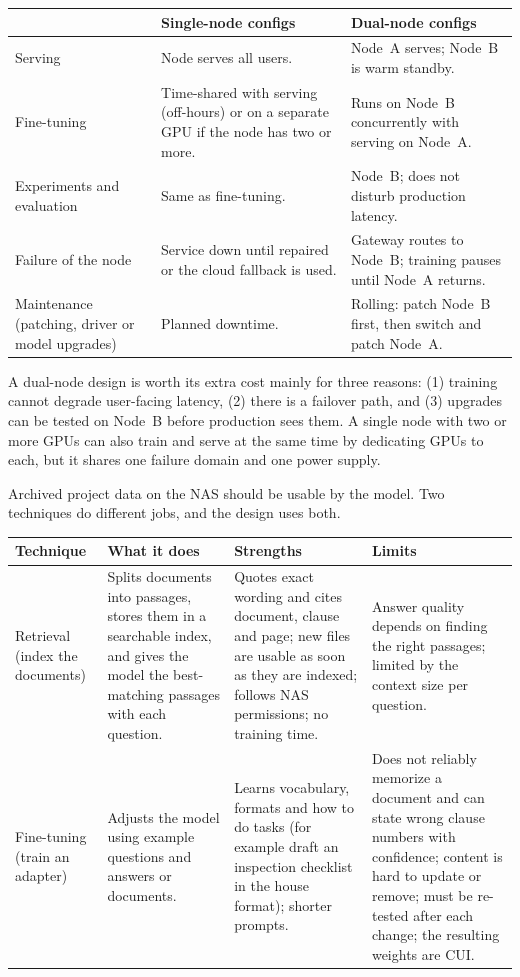 
{\small
\begin{tabularx}{\textwidth}{@{}Y{0.778}Y{1.111}Y{1.111}@{}}
  \toprule
  & Single-node configs & Dual-node configs \\
  \midrule
  Serving & Node serves all users. & Node~A serves; Node~B is warm standby. \\
  Fine-tuning & Time-shared with serving (off-hours) or on a separate GPU if the node has two or more. & Runs on Node~B concurrently with serving on Node~A. \\
  Experiments and evaluation & Same as fine-tuning. & Node~B; does not disturb production latency. \\
  Failure of the node & Service down until repaired or the cloud fallback is used. & Gateway routes to Node~B; training pauses until Node~A returns. \\
  Maintenance (patching, driver or model upgrades) & Planned downtime. & Rolling: patch Node~B first, then switch and patch Node~A. \\
  \bottomrule
\end{tabularx}}

A dual-node design is worth its extra cost mainly for three reasons: (1)
training cannot degrade user-facing latency, (2) there is a failover path, and
(3) upgrades can be tested on Node~B before production sees them. A single
node with two or more GPUs can also train and serve at the same time by
dedicating GPUs to each, but it shares one failure domain and one power supply.


Archived project data on the NAS should be usable by the model. Two techniques do
different jobs, and the design uses both.

{\footnotesize
\begin{xltabular}{\textwidth}{@{}Y{0.632} Y{1.158} Y{1.053} Y{1.157}@{}}
  \toprule
  Technique & What it does & Strengths & Limits \\
  \midrule
  \endhead
  Retrieval (index the documents) & Splits documents into passages, stores them in a searchable index, and gives the model the best-matching passages with each question. & Quotes exact wording and cites document, clause and page; new files are usable as soon as they are indexed; follows NAS permissions; no training time. & Answer quality depends on finding the right passages; limited by the context size per question. \\
  Fine-tuning (train an adapter) & Adjusts the model using example questions and answers or documents. & Learns vocabulary, formats and how to do tasks (for example draft an inspection checklist in the house format); shorter prompts. & Does not reliably memorize a document and can state wrong clause numbers with confidence; content is hard to update or remove; must be re-tested after each change; the resulting weights are CUI. \\
  \bottomrule
\end{xltabular}}

